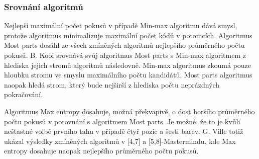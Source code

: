 


\subsubsection{Srovnání algoritmů}
Nejlepší maximální počet pokusů v případě Min-max algoritmu dává smysl, protože algoritmus minimalizuje maximální počet kódů v potomcích. Algoritmus Most parts dosáhl ze všech zmíněných algoritmů nejlepšího průměrného počtu pokusů. B. Kooi \cite{kooi} srovnává svůj algoritmus Most parts s Min-max algoritmem z hlediska jejich stromů algoritmů následovně. Min-max algoritmus zkoumá pouze hloubku stromu ve smyslu maximálního počtu kandidátů. Most parts algoritmus naopak hledá strom, který bude nejširší z hlediska počtu neprázdných pokračování. 

Algoritmus Max entropy dosahuje, možná překvapivě, o dost horšího průměrného počtu pokusů v porovnání s algoritmem Most parts. Je možné, že to je kvůli nešťastné volbě prvního tahu v případě čtyř pozic a šesti barev. G. Ville \cite{ville2013optimalmastermind47strategy} totiž ukázal výsledky zmíněných algoritmů v [4,7] a [5,8]-Mastermindu, kde Max entropy dosahuje naopak nejlepšího průměrného počtu pokusů. 





